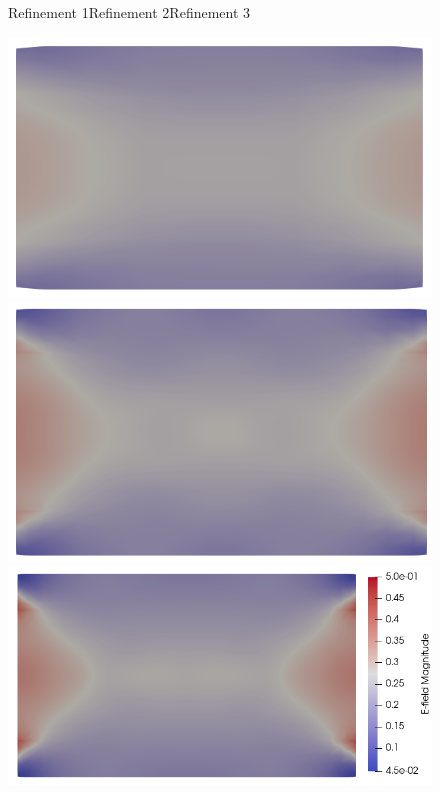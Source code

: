 \documentclass{report}
\begin{document}
\begin{figure}
    \centering
    Refinement 1\hspace{2.5cm}Refinement 2\hspace{2.5cm}Refinement 3\hspace{1cm}
    
    \includegraphics[scale=0.27]{clip_E_T-1_lambda-1e-1_8-2-2.png}
    \includegraphics[scale=0.27]{clip_E_T-1_lambda-1e-1_16-3-3.png}
    \includegraphics[scale=0.27]{clip_E_T-1_lambda-1e-1_32-3-4.png}

\end{figure}
\end{document}
